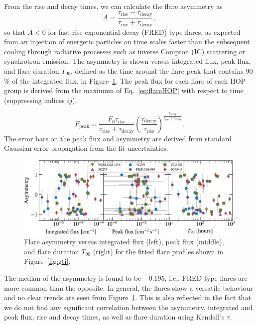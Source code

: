 \documentclass[twocolumn]{aastex62}
\begin{document}
From the rise and decay times, we can calculate the flare asymmetry as
\begin{equation}
    A = \frac{\tau_\mathrm{rise}-\tau_\mathrm{decay}}
    {\tau_\mathrm{rise}+\tau_\mathrm{decay}},
\end{equation}
so that $A < 0$ for fast-rise exponential-decay (FRED) type flares, 
as expected from an injection of energetic particles on time scales faster than the subsequent cooling through radiative processes such as inverse Compton (IC) scattering or synchrotron emission.
The asymmetry is shown versus integrated flux, peak flux, and flare duration $T_{90}$, defined as the time around the flare peak that contains 90\,\% of the integrated flux, in Figure~\ref{fig:asym}.
The peak flux for each flare of each HOP group is derived from the maximum of  Eq.~\ref{eq:flareHOP} with respect to time (suppressing indices $ij$),

\begin{equation}
    F_{\mathrm{peak}} = \frac{F_{0} \tau_\mathrm{rise}}{\tau_\mathrm{rise} + \tau_\mathrm{decay}}\left(\frac{\tau_\mathrm{decay}}{\tau_\mathrm{rise}}\right)^{\frac{\tau_\mathrm{decay}}{\tau_\mathrm{rise} + \tau_\mathrm{decay}}}.
\end{equation}
The error bars on the peak flux and asymmetry are derived from standard Gaussian error propagation from the fit uncertainties.

\begin{figure}
    \centering
    \includegraphics[width = .8\linewidth]{lcfithop_results_asym_vs_all_orbit_maxiter2_fsys0p00_addcomp0.pdf}
    \caption{Flare asymmetry versus integrated flux (left), peak flux (middle), and flare duration $T_{90}$ (right) for the fitted flare profiles shown in Figure~\ref{fig:gti}.}
    \label{fig:asym}
\end{figure}

The median of the asymmetry is found to be $-0.195$, i.e., FRED-type flares are more common than the opposite. In general, the flares show a versatile behaviour and no clear trends are seen from Figure~\ref{fig:asym}. This is also reflected in the fact that we do not find any significant correlation between the asymmetry, integrated and peak flux, rise and decay times, as well as flare duration using Kendall's $\tau$.
\end{document}

